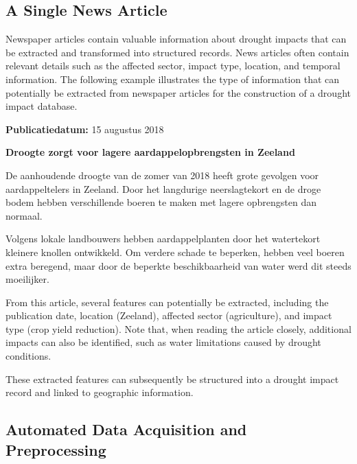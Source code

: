 \subsection{A Single News Article}

Newspaper articles contain valuable information about drought impacts that can be extracted and transformed into structured records. News articles often contain relevant details such as the affected sector, impact type, location, and temporal information. The following example illustrates the type of information that can potentially be extracted from newspaper articles for the construction of a drought impact database.

\begin{framed}
\footnotesize
\textbf{Publicatiedatum:} 15 augustus 2018

\medskip

\textbf{Droogte zorgt voor lagere aardappelopbrengsten in Zeeland}

De aanhoudende droogte van de zomer van 2018 heeft grote gevolgen voor aardappeltelers in Zeeland. Door het langdurige neerslagtekort en de droge bodem hebben verschillende boeren te maken met lagere opbrengsten dan normaal.

Volgens lokale landbouwers hebben aardappelplanten door het watertekort kleinere knollen ontwikkeld. Om verdere schade te beperken, hebben veel boeren extra beregend, maar door de beperkte beschikbaarheid van water werd dit steeds moeilijker.
\end{framed}

From this article, several features can potentially be extracted, including the publication date, location (Zeeland), affected sector (agriculture), and impact type (crop yield reduction). Note that, when reading the article closely, additional impacts can also be identified, such as water limitations caused by drought conditions.

These extracted features can subsequently be structured into a drought impact record and linked to geographic information.






\subsection{Automated Data Acquisition and Preprocessing}
\label{ch:preprocessing}

